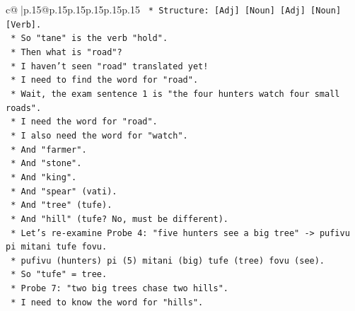 \documentclass{article}
\begin{document}
{\begin{supertabular}{c@{$\;$}|p{.15\linewidth}@{}p{.15\linewidth}p{.15\linewidth}p{.15\linewidth}p{.15\linewidth}p{.15\linewidth}}
{{{\texttt{                                            *   Structure: {[}Adj{]} {[}Noun{]} {[}Adj{]} {[}Noun{]} {[}Verb{]}.} \\
\texttt{                                            *   So "tane" is the verb "hold".} \\
\texttt{                                            *   Then what is "road"?} \\
\texttt{                                            *   I haven't seen "road" translated yet!} \\
\texttt{                                            *   I need to find the word for "road".} \\
\texttt{                                            *   Wait, the exam sentence 1 is "the four hunters watch four small roads".} \\
\texttt{                                            *   I need the word for "road".} \\
\texttt{                                            *   I also need the word for "watch".} \\
\texttt{                                            *   And "farmer".} \\
\texttt{                                            *   And "stone".} \\
\texttt{                                            *   And "king".} \\
\texttt{                                            *   And "spear" (vati).} \\
\texttt{                                            *   And "tree" (tufe).} \\
\texttt{                                            *   And "hill" (tufe? No, must be different).} \\
\texttt{                                            *   Let's re{-}examine Probe 4: "five hunters see a big tree" {-}> pufivu pi mitani tufe fovu.} \\
\texttt{                                                *   pufivu (hunters) pi (5) mitani (big) tufe (tree) fovu (see).} \\
\texttt{                                                *   So "tufe" = tree.} \\
\texttt{                                            *   Probe 7: "two big trees chase two hills".} \\
\texttt{                                                *   I need to know the word for "hills".} \\
}}}
\end{supertabular}}
\end{document}
